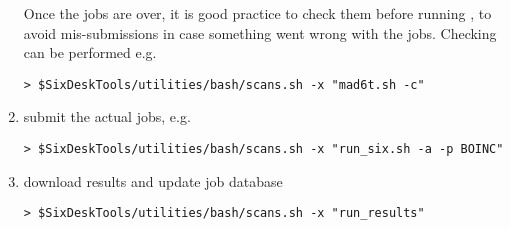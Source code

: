 \begin{enumerate}
Once the jobs are over, it is good practice to check them before
running \SIXTRACK{}, to avoid mis-submissions in case something
went wrong with the \MADX{} jobs. Checking can be performed e.g.
\begin{lstlisting}
> $SixDeskTools/utilities/bash/scans.sh -x "mad6t.sh -c"
\end{lstlisting}
\item submit the actual \SIXTRACK{} jobs, e.g.
\begin{lstlisting}
> $SixDeskTools/utilities/bash/scans.sh -x "run_six.sh -a -p BOINC"
\end{lstlisting}
\item download results and update job database
\begin{lstlisting}
> $SixDeskTools/utilities/bash/scans.sh -x "run_results"
\end{lstlisting}
\end{enumerate}

